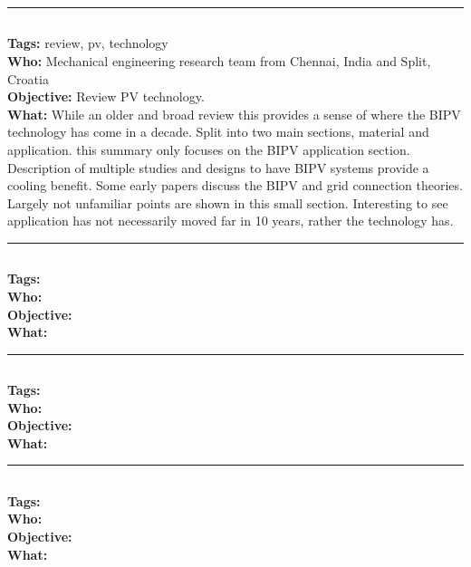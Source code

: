 \documentclass[11pt,a4paper]{article}
\begin{document}
\noindent\rule{\textwidth}{1pt}
\subsection*{}
\textbf{Tags:} review, pv, technology \\
\textbf{Who:} Mechanical engineering research team from Chennai, India and Split, Croatia \\
\textbf{Objective:} Review PV technology. \\
\textbf{What:} While an older and broad review this provides a sense of where the BIPV technology has come in a decade. Split into two main sections, material and application. this summary only focuses on the BIPV application section. Description of multiple studies and designs to have BIPV systems provide a cooling benefit. Some early papers discuss the BIPV and grid connection theories. Largely not unfamiliar points are shown in this small section. Interesting to see application has not necessarily moved far in 10 years, rather the technology has. 

\noindent\rule{\textwidth}{1pt}
\subsection*{\bibentry{}}
\textbf{Tags:}  \\
\textbf{Who:}  \\
\textbf{Objective:}  \\
\textbf{What:} 

\noindent\rule{\textwidth}{1pt}
\subsection*{\bibentry{}}
\textbf{Tags:}  \\
\textbf{Who:}  \\
\textbf{Objective:}  \\
\textbf{What:} 

\noindent\rule{\textwidth}{1pt}
\subsection*{\bibentry{}}
\textbf{Tags:}  \\
\textbf{Who:}  \\
\textbf{Objective:}  \\
\textbf{What:} 


\end{document}
